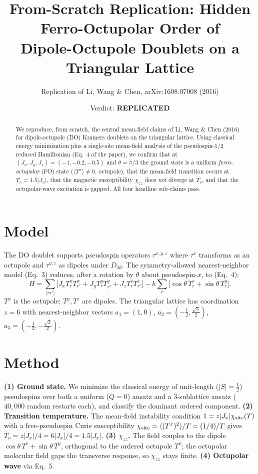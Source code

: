 \documentclass[11pt]{article}
\title{From-Scratch Replication: Hidden Ferro-Octupolar Order of\\
Dipole-Octupole Doublets on a Triangular Lattice}
\author{Replication of Li, Wang \& Chen, arXiv:1608.07008 (2016)}
\date{Verdict: \textbf{REPLICATED}}
\begin{document}
\maketitle

\begin{abstract}
We reproduce, from scratch, the central mean-field claims of Li, Wang \& Chen
(2016) for dipole-octupole (DO) Kramers doublets on the triangular lattice. Using
classical energy minimization plus a single-site mean-field analysis of the
pseudospin-$1/2$ reduced Hamiltonian (Eq.~4 of the paper), we confirm that at
$(J_x,J_y,J_z)=(-1,-0.2,-0.5)$ and $\theta=\pi/3$ the ground state is a uniform
\emph{ferro-octupolar} (FO) state ($\langle T^x\rangle\neq 0$, octupole), that the
mean-field transition occurs at $T_o=1.5|J_x|$, that the magnetic susceptibility
$\chi_{zz}$ does \emph{not} diverge at $T_o$, and that the octupolar-wave excitation
is gapped. All four headline sub-claims pass.
\end{abstract}

\section{Model}
The DO doublet supports pseudospin operators $\tau^{x,y,z}$ where $\tau^x$
transforms as an octupole and $\tau^{y,z}$ as dipoles under $D_{3d}$. The
symmetry-allowed nearest-neighbor model (Eq.~3) reduces, after a rotation by
$\theta$ about pseudospin-$x$, to (Eq.~4):
\begin{equation}
H = \sum_{\langle rr'\rangle}\!\big[J_x T_r^x T_{r'}^x + J_y T_r^y T_{r'}^y
   + J_z T_r^z T_{r'}^z\big] - h\sum_r\big[\cos\theta\,T_r^z + \sin\theta\,T_r^y\big].
\end{equation}
$T^x$ is the octupole; $T^y,T^z$ are dipoles. The triangular lattice has
coordination $z=6$ with nearest-neighbor vectors $a_1=(1,0)$,
$a_2=(-\tfrac12,\tfrac{\sqrt3}{2})$, $a_3=(-\tfrac12,-\tfrac{\sqrt3}{2})$.

\section{Method}
\textbf{(1) Ground state.} We minimize the classical energy of unit-length
($|S|=\tfrac12$) pseudospins over both a uniform ($Q=0$) ansatz and a
3-sublattice ansatz ($40{,}000$ random restarts each), and classify the dominant
ordered component.
\textbf{(2) Transition temperature.} The mean-field instability condition
$1=z|J_x|\chi_{\rm site}(T)$ with a free-pseudospin Curie susceptibility
$\chi_{\rm site}=\langle (T^x)^2\rangle/T = (1/4)/T$ gives
$T_o=z|J_x|/4 = 6|J_x|/4 = 1.5|J_x|$.
\textbf{(3) $\chi_{zz}$.} The field couples to the dipole
$\cos\theta\,T^z+\sin\theta\,T^y$, orthogonal to the ordered octupole $T^x$; the
octupolar molecular field gaps the transverse response, so $\chi_{zz}$ stays
finite. \textbf{(4) Octupolar wave} via Eq.~5.
\end{document}
